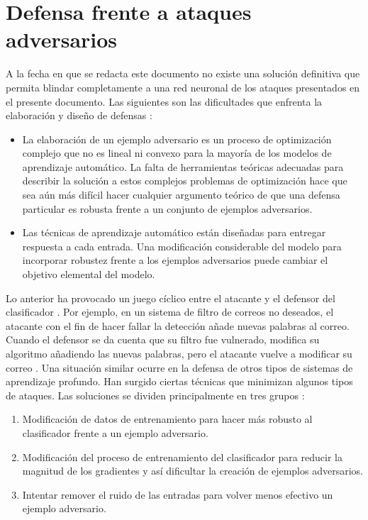 

\chapter{Defensa frente a ataques adversarios} %

\label{Defensa} %

A la fecha en que se redacta este documento no existe una solución definitiva que permita blindar completamente a una red neuronal de los ataques presentados en el presente documento. Las siguientes son las dificultades que enfrenta la elaboración y diseño de defensas \parencite{r7}:
\begin{itemize}
    \item La elaboración de un ejemplo adversario es un proceso de optimización complejo que no es lineal ni convexo para la mayoría de los modelos de aprendizaje automático. La falta de herramientas teóricas adecuadas para describir la solución a estos complejos problemas de optimización hace que sea aún más difícil hacer cualquier argumento teórico de que una defensa particular es robusta frente a un conjunto de ejemplos adversarios.

    \item Las técnicas de aprendizaje automático están diseñadas para entregar respuesta a cada entrada. Una modificación considerable del modelo para incorporar robustez frente a los ejemplos adversarios puede cambiar el objetivo elemental del modelo.
\end{itemize}
Lo anterior ha provocado un juego cíclico entre el atacante y el defensor del clasificador \parencite{r49}. Por ejemplo, en un sistema de filtro de correos no deseados, el atacante con el fin de hacer fallar la detección añade nuevas palabras al correo. Cuando el defensor se da cuenta que su filtro fue vulnerado, modifica su algoritmo añadiendo las nuevas palabras, pero el atacante vuelve a modificar su correo \parencite{r50}. Una situación similar ocurre en la defensa de otros tipos de sistemas de aprendizaje profundo.
Han surgido ciertas técnicas que minimizan algunos tipos de ataques. Las soluciones se dividen principalmente en tres grupos \parencite{r39}: 
\begin{enumerate}
    \item Modificación de datos de entrenamiento para hacer más robusto al clasificador frente a un ejemplo adversario.
    \item Modificación del proceso de entrenamiento del clasificador para reducir la magnitud de los gradientes y así dificultar la creación de ejemplos adversarios.
    \item Intentar remover el ruido de las entradas para volver menos efectivo un ejemplo adversario. 
\end{enumerate}

